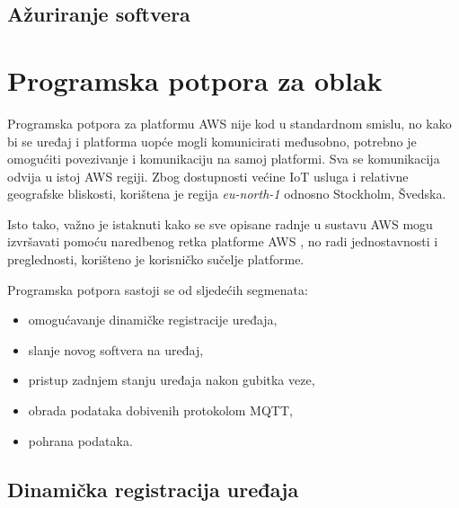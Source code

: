 \subsection{Ažuriranje softvera}

\section{Programska potpora za oblak}

Programska potpora za platformu AWS nije kod u standardnom smislu, no kako bi se uređaj i platforma uopće mogli komunicirati međusobno, potrebno je omogućiti povezivanje i komunikaciju na samoj platformi. Sva se komunikacija odvija u istoj AWS regiji. Zbog dostupnosti većine IoT usluga i relativne geografske bliskosti, korištena je regija \textit{eu-north-1} odnosno Stockholm, Švedska. 

Isto tako, važno je istaknuti kako se sve opisane radnje u sustavu AWS mogu izvršavati pomoću naredbenog retka platforme AWS , no radi jednostavnosti i preglednosti, korišteno je korisničko sučelje platforme.

Programska potpora sastoji se od sljedećih segmenata:
\begin{itemize}
	\item omogućavanje dinamičke registracije uređaja,
	\item slanje novog softvera na uređaj,
	\item pristup zadnjem stanju uređaja nakon gubitka veze,
	\item obrada podataka dobivenih protokolom MQTT,
	\item pohrana podataka.
\end{itemize}

\subsection{Dinamička registracija uređaja}

